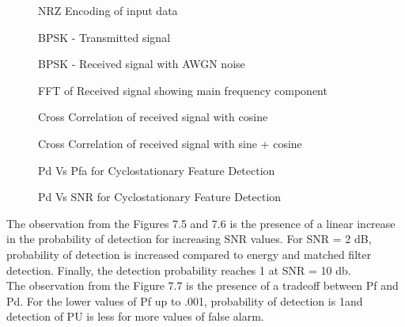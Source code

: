 \documentclass[a4paper]{article}
\begin{document}
\begin{figure}[h!bt]
  \centering
  
  \caption{NRZ Encoding of input data}
  \label{fig:3.1}
\end{figure}
\begin{figure}[h!bt]
  \centering
  
  \caption{BPSK - Transmitted signal}
  \label{fig:3.2}
\end{figure}
\begin{figure}[h!bt]
  \centering
  
  \caption{BPSK - Received signal with AWGN noise}
  \label{fig:3.3}
\end{figure}
\begin{figure}[h!bt]
  \centering
  
  \caption{FFT of Received signal showing main frequency component}
  \label{fig:3.4}
\end{figure}
\begin{figure}[h!bt]
  \centering
  
  \caption{Cross Correlation of received signal with cosine}
  \label{fig:3.5}
\end{figure}
\begin{figure}[h!bt]
  \centering
  
  \caption{Cross Correlation of received signal with sine + cosine}
  \label{fig:3.6}
\end{figure}
\begin{figure}[h!bt]
  \centering
  
  \caption{Pd Vs Pfa for Cyclostationary Feature Detection}
  \label{fig:3.7}
\end{figure}
\begin{figure}[h!bt]
  \centering
  
  \caption{Pd Vs SNR for Cyclostationary Feature Detection}
  \label{fig:3.8}
\end{figure}
The observation from the Figures 7.5 and 7.6 is the presence of a linear increase
in the probability of detection for increasing SNR values. For SNR = 2 dB,
probability of detection is increased compared to energy and matched filter
detection. Finally, the detection probability reaches 1 at SNR = 10 db.\\[4pt]
The observation from the Figure 7.7 is the presence of a tradeoff between Pf
and Pd. For the lower values of Pf up to .001, probability of detection is 1and
detection of PU is less for more values of false alarm.\\
\newpage
\end{document}
